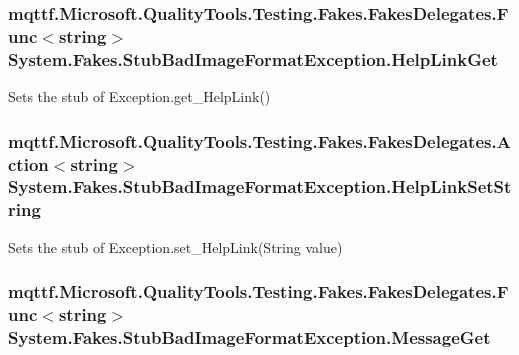 \hypertarget{class_system_1_1_fakes_1_1_stub_bad_image_format_exception_a064b4d08384000d3b5bc179f489855cb}{
\subsubsection[{Help\-Link\-Get}]{\setlength{\rightskip}{0pt plus 5cm}mqttf.\-Microsoft.\-Quality\-Tools.\-Testing.\-Fakes.\-Fakes\-Delegates.\-Func$<$string$>$ System.\-Fakes.\-Stub\-Bad\-Image\-Format\-Exception.\-Help\-Link\-Get}}\label{class_system_1_1_fakes_1_1_stub_bad_image_format_exception_a064b4d08384000d3b5bc179f489855cb}


Sets the stub of Exception.\-get\-\_\-\-Help\-Link()

\hypertarget{class_system_1_1_fakes_1_1_stub_bad_image_format_exception_a5d572250f550b42073e81ae5cab94a23}{
\subsubsection[{Help\-Link\-Set\-String}]{\setlength{\rightskip}{0pt plus 5cm}mqttf.\-Microsoft.\-Quality\-Tools.\-Testing.\-Fakes.\-Fakes\-Delegates.\-Action$<$string$>$ System.\-Fakes.\-Stub\-Bad\-Image\-Format\-Exception.\-Help\-Link\-Set\-String}}\label{class_system_1_1_fakes_1_1_stub_bad_image_format_exception_a5d572250f550b42073e81ae5cab94a23}


Sets the stub of Exception.\-set\-\_\-\-Help\-Link(\-String value)

\hypertarget{class_system_1_1_fakes_1_1_stub_bad_image_format_exception_acd69398e0c2125d933c293f201dc956f}{
\subsubsection[{Message\-Get}]{\setlength{\rightskip}{0pt plus 5cm}mqttf.\-Microsoft.\-Quality\-Tools.\-Testing.\-Fakes.\-Fakes\-Delegates.\-Func$<$string$>$ System.\-Fakes.\-Stub\-Bad\-Image\-Format\-Exception.\-Message\-Get}}\label{class_system_1_1_fakes_1_1_stub_bad_image_format_exception_acd69398e0c2125d933c293f201dc956f}


